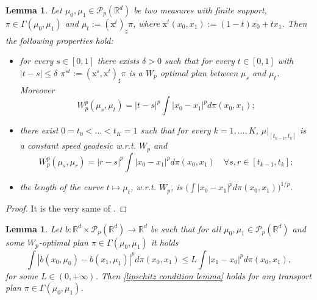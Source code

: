 \documentclass[10pt,leqno]{amsart}
\numberwithin{equation}{section}
\newtheorem{lemma}[teorema]{Lemma}
\newcommand{\R}{\mathbb{R}}
\newcommand{\PP}{\mathcal{P}}
\begin{document}
    \begin{lemma}\label{interpolating curve lemma}
        Let $\mu_0,\mu_1\in \PP_p(\R^d) $ be two measures with finite support, $\pi\in \Gamma(\mu_0,\mu_1)$ and $\mu_t := (\mathrm{x}^t)_\sharp \pi$, where $\mathrm{x}^t(x_0,x_1) := (1-t)x_0 + t x_1$. Then the following properties hold:
        \begin{itemize}
            \item[(i)] for every $s\in [0,1]$ there exists $\delta > 0$ such that for every $t\in [0,1]$ with $|t-s|\leq \delta$ $\pi^{st}:= (\mathrm{x}^s,\mathrm{x}^t)_\sharp \pi $ is a $W_p$ optimal plan between $\mu_s$ and $\mu_t$. Moreover 
            \begin{equation}
                W_p^p(\mu_s,\mu_t) = |t-s|^p \int |x_0 - x_1|^pd\pi(x_0,x_1);
            \end{equation}
            \item[(ii)] there exist $0=t_0 < \dots < t_K =1$ such that for every $k=1,\dots,K$, $\mu|_{[t_{k-1},t_k]}$ is a constant speed geodesic w.r.t. $W_p$ and 
            \begin{equation}
                W_p^p(\mu_{s},\mu_{r}) = |r - s|^p \int |x_0-x_1|^p d\pi(x_0,x_1) \quad \forall s,r\in[t_{k-1},t_k];
            \end{equation}
            \item[(iii)] the length of the curve $t\mapsto \mu_t$, w.r.t. $W_p$, is $\big(\int |x_0-x_1|^p d\pi(x_0,x_1)\big)^{1/p}$.  \end{itemize}
    \end{lemma}

    \begin{proof}
        It is the very same of \cite[Theorem 6.2]{cavagnari2023lagrangian}.
    \end{proof}

    \begin{lemma}\label{lipschitz along optimal plans implies lipschitz on any plan}
        Let $b:\R^d \times \PP_p(\R^d) \to \R^d$ be such that for all $\mu_0,\mu_1\in \PP_p(\R^d)$ and some $W_p$-optimal plan $\pi\in\Gamma(\mu_0,\mu_1)$ it holds
        \begin{equation}\label{lipschitz condition lemma}
            \int |b(x_0,\mu_0) - b(x_1,\mu_1)|^p d\pi(x_0,x_1) \leq L\int | x_1 - x_0 |^p d\pi(x_0,x_1),
        \end{equation}
        for some $L\in(0,+\infty)$. Then \eqref{lipschitz condition lemma} holds for any transport plan $\pi\in \Gamma(\mu_0,\mu_1)$.
    \end{lemma}
\end{document}
